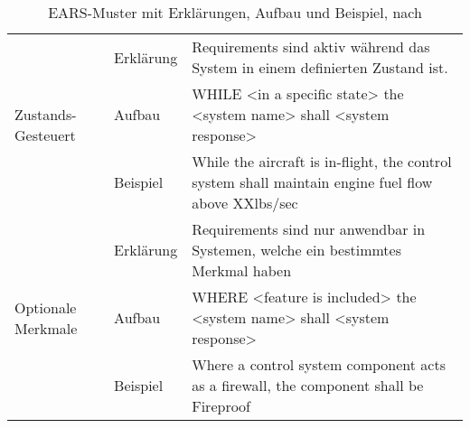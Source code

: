 \begin{table}[]
\begin{tabularx}{\textwidth}{p{}|p{}|p{}}
		\multirow{3}{0.0\textwidth}{Zustands-Gesteuert} & Erklärung & Requirements sind aktiv während das System in einem definierten Zustand ist. \\ \cline{2-3}
		& Aufbau  & WHILE <in a specific state> the <system name> shall <system response> \\  \cline{2-3}
		& Beispiel & While the aircraft is in-flight, the control system shall maintain engine fuel flow above XXlbs/sec \\ \hline
		\multirow{3}{0.0\textwidth}{Optionale Merkmale} & Erklärung & Requirements sind nur anwendbar in Systemen, welche ein bestimmtes Merkmal haben \\  \cline{2-3}
		& Aufbau  & WHERE <feature is included> the <system name> shall <system response> \\ \cline{2-3}
		& Beispiel & Where a control system component acts as a firewall, the component shall be Fireproof \\ \hline
	\end{tabularx}
	\caption{EARS-Muster mit Erklärungen, Aufbau und Beispiel, nach \cite{MW10}}
	\label{tab:EARSTemplates}
\end{table}
